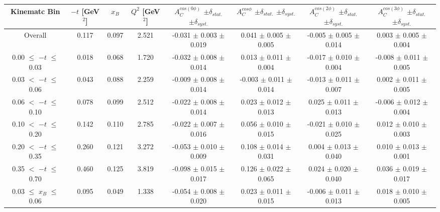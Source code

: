 {\begin{table}[width=15cm]
 \begin{center}
\resizebox{16cm}{!} {
  \begin{tabular}{|c|c|c|c|c|c|c|c|}
\hline
Kinematc Bin &  $-t$ [GeV$^{2}$] & $x_{B}$ & $Q^{2}$ [GeV$^{2}$] & 
$A^{cos (0\phi)}_{C}$ $\pm \delta_{stat.}$ $\pm \delta_{syst.}$ & $A^{cos \phi}_{C}$ $\pm \delta_{stat.}$ $\pm \delta_{syst.}$
& $A^{cos (2\phi)}_{C}$ $\pm \delta_{stat.}$ $\pm \delta_{syst.}$ & $A^{cos (3\phi)}_{C}$ $\pm \delta_{stat.}$ $\pm \delta_{syst.}$ \\
\hline
\hline
Overall &  0.117 & 0.097 &  2.521 &  -0.031 $\pm$  0.003 $\pm$  0.019 & 
0.041  $\pm$  0.005 $\pm$   0.005 &  -0.005  $\pm$  0.005  $\pm$   0.014 &  0.003  $\pm$   0.005   $\pm$   0.004 \\
\hline
0.00 $\leqslant$ $-t$ $\leqslant$ 0.03 &  0.018 & 0.068 &  1.720 &  -0.032  $\pm$  0.008 $\pm$ 0.014 & 
0.013  $\pm$  0.011  $\pm$   0.004 &  -0.017  $\pm$  0.010 $\pm$  0.004 &  -0.008   $\pm$  0.011   $\pm$   0.005\\
0.03 $<$ $-t$ $\leqslant$ 0.06 &  0.043 & 0.088 &  2.259& -0.009  $\pm$  0.008  $\pm$   0.014 &
 -0.003 $\pm$  0.011  $\pm$   0.014 &  -0.013  $\pm$  0.011  $\pm$  0.007 &  0.002   $\pm$  0.011   $\pm$   0.005\\
0.06 $<$ $-t$ $\leqslant$ 0.10 &  0.078 & 0.099 &  2.512 & -0.022  $\pm$  0.008  $\pm$  0.014 & 
0.023 $\pm$  0.012  $\pm$   0.013 & 0.025  $\pm$  0.011 $\pm$   0.013 &  -0.006   $\pm$  0.012  $\pm$    0.004\\
0.10 $<$ $-t$ $\leqslant$ 0.20 &  0.142 & 0.110 &  2.785 &  -0.022  $\pm$  0.007   $\pm$  0.016 & 
0.056 $\pm$  0.010  $\pm$   0.015 &  -0.021  $\pm$  0.010  $\pm$  0.025 & 0.012   $\pm$  0.010    $\pm$  0.003\\
0.20 $<$ $-t$ $\leqslant$ 0.35 &  0.260 & 0.121 &  3.272 &  -0.053 $\pm$   0.010  $\pm$  0.009 &
0.108 $\pm$  0.014  $\pm$ 0.031 & 0.004 $\pm$   0.013  $\pm$  0.040 & 0.010  $\pm$   0.013   $\pm$   0.001\\
0.35 $<$ $-t$ $\leqslant$ 0.70 &  0.460 & 0.125 &  3.819 &  -0.098  $\pm$  0.015  $\pm$   0.017 & 
0.126 $\pm$  0.022  $\pm$   0.065 & 0.024 $\pm$   0.020  $\pm$  0.040 & 0.036   $\pm$  0.019   $\pm$ 0.017\\
\hline
0.03 $\leqslant$ $x_{B}$ $\leqslant$ 0.06 &  0.095 & 0.049 &  1.338 &  -0.054  $\pm$  0.008  $\pm$   0.020 & 
0.023  $\pm$  0.011  $\pm$   0.015 & -0.006 $\pm$  0.011 $\pm$  0.013 &  0.018   $\pm$  0.010  $\pm$    0.005\\

\end{tabular}}
\end{center}
\end{table}}
